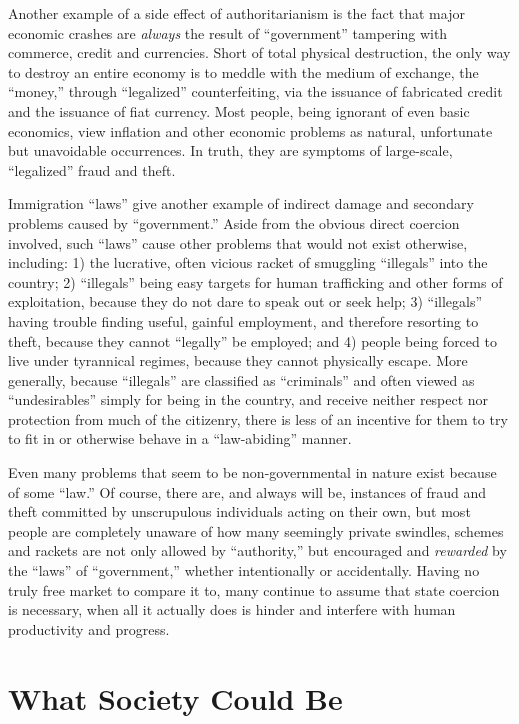 \documentclass{book}
\begin{document}
Another example of a side effect of authoritarianism is the fact that major economic crashes are \emph{always} the result of \enquote{government} tampering with commerce, credit and currencies. Short of total physical destruction, the only way to destroy an entire economy is to meddle with the medium of exchange, the \enquote{money,} through \enquote{legalized} counterfeiting, via the issuance of fabricated credit and the issuance of fiat currency. Most people, being ignorant of even basic economics, view inflation and other economic problems as natural, unfortunate but unavoidable occurrences. In truth, they are symptoms of large-scale, \enquote{legalized} fraud and theft.

Immigration \enquote{laws} give another example of indirect damage and secondary problems caused by \enquote{government.} Aside from the obvious direct coercion involved, such \enquote{laws} cause other problems that would not exist otherwise, including: 1) the lucrative, often vicious racket of smuggling \enquote{illegals} into the country; 2) \enquote{illegals} being easy targets for human trafficking and other forms of exploitation, because they do not dare to speak out or seek help; 3) \enquote{illegals} having trouble finding useful, gainful employment, and therefore resorting to theft, because they cannot \enquote{legally} be employed; and 4) people being forced to live under tyrannical regimes, because they cannot physically escape. More generally, because \enquote{illegals} are classified as \enquote{criminals} and often viewed as \enquote{undesirables} simply for being in the country, and receive neither respect nor protection from much of the citizenry, there is less of an incentive for them to try to fit in or otherwise behave in a \enquote{law-abiding} manner.

Even many problems that seem to be non-governmental in nature exist because of some \enquote{law.} Of course, there are, and always will be, instances of fraud and theft committed by unscrupulous individuals acting on their own, but most people are completely unaware of how many seemingly private swindles, schemes and rackets are not only allowed by \enquote{authority,} but encouraged and \emph{rewarded} by the \enquote{laws} of \enquote{government,} whether intentionally or accidentally. Having no truly free market to compare it to, many continue to assume that state coercion is necessary, when all it actually does is hinder and interfere with human productivity and progress.

\section{What Society Could Be}
\end{document}
